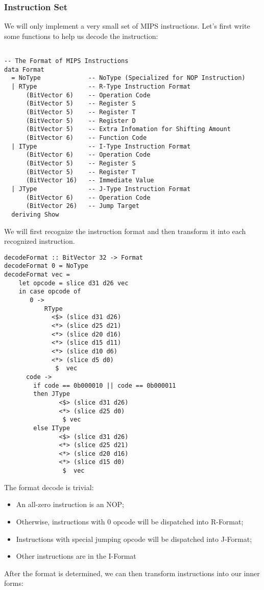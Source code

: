 \subsubsection{Instruction Set}
We will only implement a very small set of MIPS instructions. Let's first write some functions to help us decode the instruction:
\begin{verbatim}

-- The Format of MIPS Instructions
data Format            
  = NoType             -- NoType (Specialized for NOP Instruction)
  | RType              -- R-Type Instruction Format
      (BitVector 6)    -- Operation Code
      (BitVector 5)    -- Register S
      (BitVector 5)    -- Register T
      (BitVector 5)    -- Register D
      (BitVector 5)    -- Extra Infomation for Shifting Amount
      (BitVector 6)    -- Function Code
  | IType              -- I-Type Instruction Format
      (BitVector 6)    -- Operation Code
      (BitVector 5)    -- Register S
      (BitVector 5)    -- Register T
      (BitVector 16)   -- Immediate Value
  | JType              -- J-Type Instruction Format 
      (BitVector 6)    -- Operation Code
      (BitVector 26)   -- Jump Target
  deriving Show
\end{verbatim}
We will first recognize the instruction format and then transform it into each recognized instruction.
\begin{verbatim}
decodeFormat :: BitVector 32 -> Format
decodeFormat 0 = NoType
decodeFormat vec =
    let opcode = slice d31 d26 vec
    in case opcode of
       0 ->
           RType 
             <$> (slice d31 d26)
             <*> (slice d25 d21) 
             <*> (slice d20 d16) 
             <*> (slice d15 d11) 
             <*> (slice d10 d6) 
             <*> (slice d5 d0) 
              $  vec
      code -> 
        if code == 0b000010 || code == 0b000011
        then JType 
               <$> (slice d31 d26) 
               <*> (slice d25 d0) 
                $ vec
        else IType 
               <$> (slice d31 d26) 
               <*> (slice d25 d21) 
               <*> (slice d20 d16) 
               <*> (slice d15 d0) 
                $  vec
\end{verbatim}
The format decode is trivial:
\begin{itemize}
	\item An all-zero instruction is an NOP;
	\item Otherwise, instructions with 0 opcode will be dispatched into R-Format;
	\item Instructions with special jumping opcode will be dispatched into J-Format;
	\item Other instructions are in the I-Format
\end{itemize}
After the format is determined, we can then transform instructions into our inner forms:

